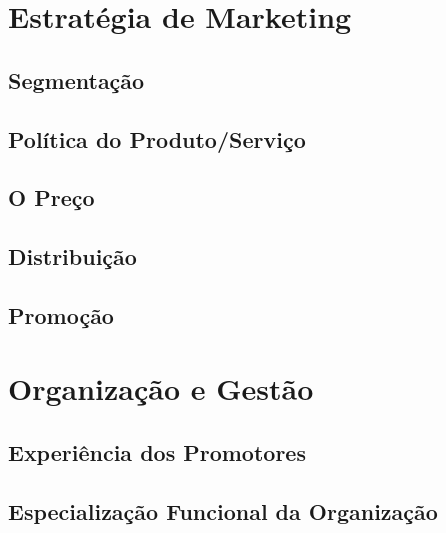 \documentclass[11pt]{article}
\begin{document}
	\pagebreak
	
	\large
	\section{Estratégia de Marketing}
	
	\normalsize
	
	
	\large
	\subsection{Segmentação}
	
	\normalsize
	
	
	\large
	\subsection{Política do Produto/Serviço}
	
	\normalsize
	
	
	\large
	\subsection{O Preço}
	
	\normalsize
	
	
	\large
	\subsection{Distribuição}
	
	\normalsize
	
	
	\large
	\subsection{Promoção}
	
	\normalsize
	
	\pagebreak
	
	\large
	\section{Organização e Gestão}
	
	\normalsize
	
	
	\large
	\subsection{Experiência dos Promotores}
	
	\normalsize
	
	
	\large
	\subsection{Especialização Funcional da Organização}
	
\end{document}
